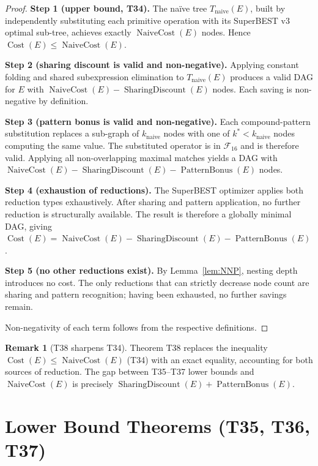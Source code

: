 \documentclass[12pt,a4paper]{article}
\theoremstyle{definition}
\newtheorem{remark}[theorem]{Remark}
\newcommand{\Cost}{\operatorname{Cost}}
\newcommand{\NC}{\operatorname{NaiveCost}}
\newcommand{\SD}{\operatorname{SharingDiscount}}
\newcommand{\PB}{\operatorname{PatternBonus}}
\begin{document}
\begin{proof}
\textbf{Step 1 (upper bound, T34).}
The na\"{i}ve tree $T_{\mathrm{naive}}(E)$, built by independently substituting
each primitive operation with its SuperBEST v3 optimal sub-tree, achieves
exactly $\NC(E)$ nodes.  Hence $\Cost(E) \leq \NC(E)$.

\textbf{Step 2 (sharing discount is valid and non-negative).}
Applying constant folding and shared subexpression elimination to
$T_{\mathrm{naive}}(E)$ produces a valid DAG for $E$ with
$\NC(E) - \SD(E)$ nodes.  Each saving is non-negative by definition.

\textbf{Step 3 (pattern bonus is valid and non-negative).}
Each compound-pattern substitution replaces a sub-graph of $k_{\mathrm{naive}}$
nodes with one of $k^* < k_{\mathrm{naive}}$ nodes computing the same value.
The substituted operator is in $\mathcal{F}_{16}$ and is therefore valid.
Applying all non-overlapping maximal matches yields a DAG with
$\NC(E) - \SD(E) - \PB(E)$ nodes.

\textbf{Step 4 (exhaustion of reductions).}
The SuperBEST optimizer applies both reduction types exhaustively.  After
sharing and pattern application, no further reduction is structurally
available.  The result is therefore a globally minimal DAG, giving
$\Cost(E) = \NC(E) - \SD(E) - \PB(E)$.

\textbf{Step 5 (no other reductions exist).}
By Lemma~\ref{lem:NNP}, nesting depth introduces no cost.  The only
reductions that can strictly decrease node count are sharing and pattern
recognition; having been exhausted, no further savings remain.

Non-negativity of each term follows from the respective definitions.
\end{proof}

\begin{remark}[T38 sharpens T34]
Theorem T38 replaces the inequality $\Cost(E) \leq \NC(E)$ (T34) with an
exact equality, accounting for both sources of reduction.  The gap between
T35--T37 lower bounds and $\NC(E)$ is precisely $\SD(E) + \PB(E)$.
\end{remark}

\section{Lower Bound Theorems (T35, T36, T37)}
\label{sec:lower}
\end{document}
